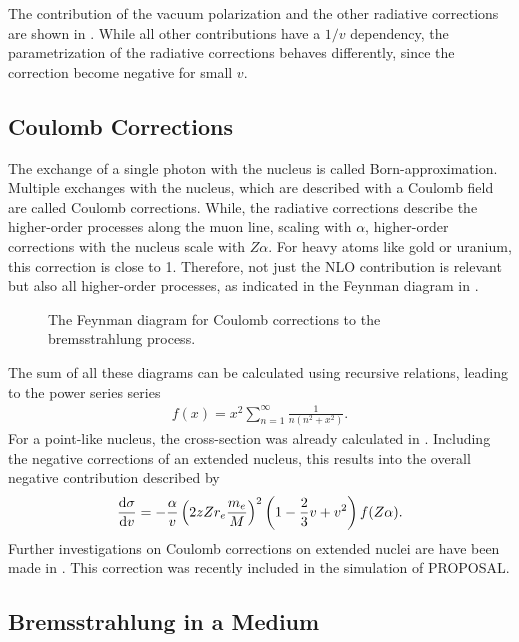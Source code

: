 The contribution of the vacuum polarization and the other radiative corrections are shown in .
While all other contributions have a $1/v$ dependency, the parametrization of the radiative corrections behaves differently, since the correction become negative for small $v$.
 
\subsection{Coulomb Corrections} \label{sec:brems_coulomb}

The exchange of a single photon with the nucleus is called Born-approximation.
Multiple exchanges with the nucleus, which are described with a Coulomb field are called Coulomb corrections.
While, the radiative corrections describe the higher-order processes along the muon line, scaling with $\alpha$, higher-order corrections with the nucleus scale with $Z\alpha$.
For heavy atoms like gold or uranium, this correction is close to 1.
Therefore, not just the NLO contribution is relevant but also all higher-order processes, as indicated in the Feynman diagram in .
\begin{figure}
    \centering
    
    \caption{The Feynman diagram for Coulomb corrections to the bremsstrahlung process.}
    \label{fig:feyn_brems_coulomb}
\end{figure}
The sum of all these diagrams can be calculated using recursive relations, leading to the power series series
\begin{align} \label{eq:coulomb_series}
    f(x) = x^2 \sum_{n=1}^{\infty} \frac{1}{n(n^2 + x^2)} .
\end{align}
For a point-like nucleus, the cross-section was already calculated in \cite{Bethe54I, Davis54II}.
Including the negative corrections of an extended nucleus, this results into the overall negative contribution described by \cite{Andreev97}
\begin{align}
\frac{\mathrm{d} \sigma}{\mathrm{d} v} =
    - \frac{\alpha}{v} \left( 2 z Z r_e \frac{m_e}{M} \right)^2
    \left( 1 - \frac23 v + v^2 \right)
    f(Z\alpha) .
\end{align}
Further investigations on Coulomb corrections on extended nuclei are have been made in \cite{Sandrock18Coulomb}.
This correction was recently included in the simulation of PROPOSAL.

\subsection{Bremsstrahlung in a Medium}

